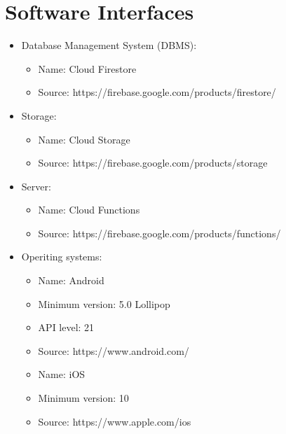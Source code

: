 \section{Software Interfaces}
\begin{itemize}
    \item Database Management System (DBMS):
    \begin{itemize}
        \item 
        Name: Cloud Firestore
        \item 
        Source: https://firebase.google.com/products/firestore/
    \end{itemize}
    \item Storage:
    \begin{itemize}
        \item 
        Name: Cloud Storage
        \item 
        Source: https://firebase.google.com/products/storage
    \end{itemize}
    \item Server:
    \begin{itemize}
        \item 
        Name: Cloud Functions
        \item 
        Source: https://firebase.google.com/products/functions/
    \end{itemize}
    \item
    Operiting systems:
    \begin{itemize}
        \item 
        Name: Android
        \item 
        Minimum version: 5.0 Lollipop 
        \item 
        API level: 21
        \item 
        Source: https://www.android.com/\\ 
        \item 
        Name: iOS
        \item 
        Minimum version: 10
        \item 
        Source: https://www.apple.com/ios
    \end{itemize}
\end{itemize}
